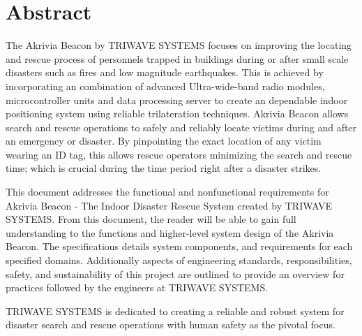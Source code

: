 %


\section*{Abstract}	
\medskip
The Akrivia Beacon by TRIWAVE SYSTEMS focuses on improving the locating and rescue process of personnels trapped in buildings during or after small scale disasters such as fires and low magnitude earthquakes. This is achieved by incorporating an combination of advanced Ultra-wide-band radio modules, microcontroller units and data processing server to create an dependable indoor positioning system using reliable trilateration techniques. Akrivia Beacon allows search and rescue operations to safely and reliably locate victims during and after an emergency or disaster. By pinpointing the exact location of any victim wearing an ID tag, this allows rescue operators minimizing the search and rescue time; which is crucial during the time period right after a disaster strikes.

\bigskip
This document addresses the functional and nonfunctional requirements for Akrivia Beacon - The Indoor Disaster Rescue System created by TRIWAVE SYSTEMS. From this document, the reader will be able to gain full understanding to the functions and higher-level system design of the Akrivia Beacon. The specifications details system components, and requirements for each specified domains. Additionally aspects of engineering standards, responsibilities, safety, and sustainability of this project are outlined to provide an overview for practices followed by the engineers at TRIWAVE SYSTEMS.

\bigskip
TRIWAVE SYSTEMS is dedicated to creating a reliable and robust system for disaster search and rescue operations with human safety as the pivotal focus.   

%